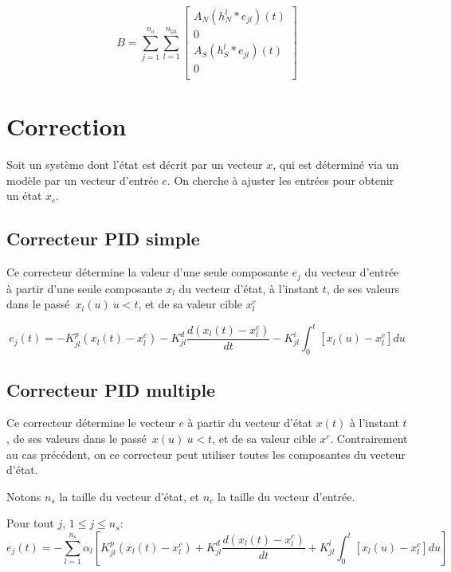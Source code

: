 \documentclass[a4paper,12pt]{article}
\begin{document}
\[
  B =  \sum_{j=1}^{n_a}\sum_{l=1}^{n_{\text{lat}}} 
  \begin{bmatrix}
 A_N \left(h_N^l \ast  e_{jl}\right)(t)  \\
0   \\
 A_S \left(h_S^l \ast  e_{jl}\right)(t)  \\
0  \\
\end{bmatrix}\]


\section{Correction}

Soit un système dont l'état est décrit par un vecteur $x$, qui est déterminé via un modèle par un vecteur d'entrée $e$. On cherche
à ajuster les entrées pour obtenir un état $x_c$. 


\subsection{Correcteur PID simple}

Ce correcteur détermine la valeur  d'une seule composante $e_j$ du vecteur d'entrée à partir d'une seule composante $x_l$ du vecteur d'état, à l'instant $t$, 
de ses valeurs dans le passé\ $x_l(u)\ u < t$, et de sa valeur cible $x^c_{l}$

\begin{equation} 
  e_{j}(t)=-K^p_{jl}(x_l(t)-x_l^c) - K^d_{jl}\frac{d(x_l(t)-x^c_l)}{dt} - K^i_{jl}\int_0^{t} \left[x_l(u)-x^c_l\right]du
\end{equation}

\subsection{Correcteur PID multiple}

Ce correcteur détermine le vecteur $e$ à partir du vecteur d'état $x(t)$ à l'instant $t$, 
de ses valeurs dans le passé\ $x(u)\  u < t$, et de sa valeur cible $x^c$. Contrairement au cas précédent,
on ce correcteur peut utiliser toutes les composantes du vecteur d'état. 

Notons $n_s$ la taille du vecteur d'état, et $n_c$ la taille du vecteur d'entrée.

Pour tout $j$, $1 \le j \le n_s$:
\begin{equation} 
  e_{j}(t)=-\sum_{l=1}^{n_s}\alpha_l \left[K_{jl}^p(x_l(t)-x_l^c) + K_{jl}^d\frac{d(x_l(t)-x^c_l)}{dt} + K^i_{jl}\int_0^{t} \left[x_l(u)-x^c_l\right]du \right]
\end{equation}
\end{document}
